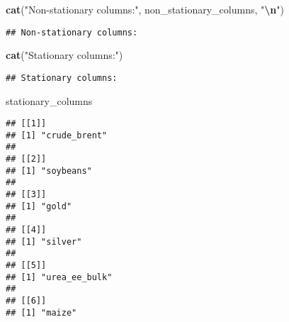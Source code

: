 \documentclass[
]{article}
\newenvironment{Shaded}{\begin{snugshade}}{\end{snugshade}}
\newcommand{\AttributeTok}[1]{\textcolor[rgb]{0.13,0.29,0.53}{#1}}
\newcommand{\CommentTok}[1]{\textcolor[rgb]{0.56,0.35,0.01}{\textit{#1}}}
\newcommand{\DecValTok}[1]{\textcolor[rgb]{0.00,0.00,0.81}{#1}}
\newcommand{\FunctionTok}[1]{\textcolor[rgb]{0.13,0.29,0.53}{\textbf{#1}}}
\newcommand{\NormalTok}[1]{#1}
\newcommand{\OtherTok}[1]{\textcolor[rgb]{0.56,0.35,0.01}{#1}}
\newcommand{\SpecialCharTok}[1]{\textcolor[rgb]{0.81,0.36,0.00}{\textbf{#1}}}
\newcommand{\StringTok}[1]{\textcolor[rgb]{0.31,0.60,0.02}{#1}}
\begin{document}
\begin{Shaded}
\begin{Highlighting}[]
\FunctionTok{cat}\NormalTok{(}\StringTok{"Non{-}stationary columns:"}\NormalTok{, non\_stationary\_columns, }\StringTok{"}\SpecialCharTok{\textbackslash{}n}\StringTok{"}\NormalTok{)}
\end{Highlighting}
\end{Shaded}

\begin{verbatim}
## Non-stationary columns:
\end{verbatim}

\begin{Shaded}
\begin{Highlighting}[]
\FunctionTok{cat}\NormalTok{(}\StringTok{"Stationary columns:"}\NormalTok{)}
\end{Highlighting}
\end{Shaded}

\begin{verbatim}
## Stationary columns:
\end{verbatim}

\begin{Shaded}
\begin{Highlighting}[]
\NormalTok{stationary\_columns}
\end{Highlighting}
\end{Shaded}

\begin{verbatim}
## [[1]]
## [1] "crude_brent"
## 
## [[2]]
## [1] "soybeans"
## 
## [[3]]
## [1] "gold"
## 
## [[4]]
## [1] "silver"
## 
## [[5]]
## [1] "urea_ee_bulk"
## 
## [[6]]
## [1] "maize"
\end{verbatim}

\begin{Shaded}
\end{Shaded}
\end{document}
